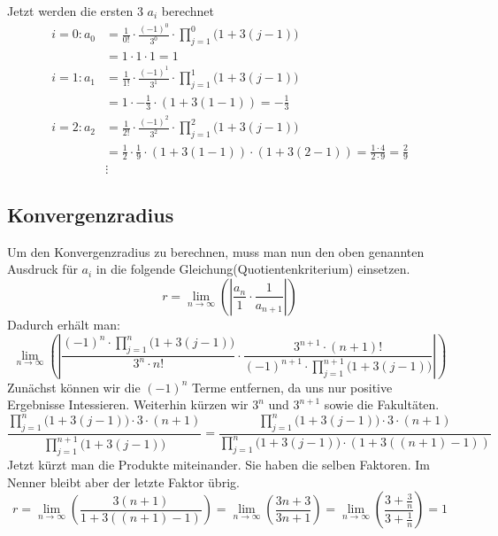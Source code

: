 \documentclass[18pt,a4paper]{article}
\begin{document}
Jetzt werden die ersten 3 $a_i$ berechnet
\begin{align*}
i=0: a_0 &= \frac{1}{0!} \cdot \frac{(-1)^0}{3^0}\cdot\prod_{j=1}^{0}\Big(1+3(j-1)\Big)\\
\quad &= 1 \cdot 1 \cdot 1 = 1\\
%
i=1: a_1 &= \frac{1}{1!} \cdot \frac{(-1)^1}{3^1}\cdot\prod_{j=1}^{1}\Big(1+3(j-1)\Big)\\
\quad &= 1 \cdot -\frac{1}{3} \cdot (1+3(1-1)) = -\frac{1}{3}\\
%
i=2: a_2 &= \frac{1}{2!} \cdot \frac{(-1)^2}{3^2}\cdot\prod_{j=1}^{2}\Big(1+3(j-1)\Big)\\
\quad &= \frac{1}{2} \cdot \frac{1}{9} \cdot (1+3(1-1))\cdot(1+3(2-1)) = \frac{1\cdot4}{2\cdot 9} = \frac{2}{9}\\
&\vdots
\end{align*}
\subsection*{Konvergenzradius}
Um den Konvergenzradius zu berechnen, muss man nun den oben genannten Ausdruck für $a_i$ in die folgende Gleichung(Quotientenkriterium) einsetzen.
\begin{equation*}
r = \lim_{n \to \infty}\left(\left|\frac{a_n}{1}\cdot \frac{1}{a_{n+1}}\right|\right)
\end{equation*}
Dadurch erhält man:
\begin{equation*}
\lim_{n \to \infty}\left(\left|\frac{(-1)^n \cdot\displaystyle\prod_{j=1}^{n}\Big(1+3(j-1)\Big)}{3^n \cdot n!} \cdot \frac{3^{n+1} \cdot (n+1)!}{(-1)^{n+1} \cdot\displaystyle\prod_{j=1}^{n+1}\Big(1+3(j-1)\Big)}\right|\right)
\end{equation*}
Zunächst können wir die $(-1)^n$ Terme entfernen, da uns nur positive Ergebnisse Intessieren. Weiterhin kürzen wir $3^n$ und $3^{n+1}$ sowie die Fakultäten.
\begin{equation*}
\frac{\displaystyle\prod_{j=1}^{n}\Big(1+3(j-1)\Big) \cdot 3 \cdot (n+1)}{\displaystyle\prod_{j=1}^{n+1}\Big(1+3(j-1)\Big)}
=
\frac{\displaystyle\prod_{j=1}^{n}\Big(1+3(j-1)\Big) \cdot 3 \cdot (n+1)}{\displaystyle\prod_{j=1}^{n}\Big(1+3(j-1)\Big)\cdot (1+3((n+1)-1))}
\end{equation*}
Jetzt kürzt man die Produkte miteinander. Sie haben die selben Faktoren. Im Nenner bleibt aber der letzte Faktor übrig.\\
\begin{equation*}
r = \lim_{n \to \infty}\left(\frac{3(n+1 )}{1+3((n+1)-1)}\right) = \lim_{n \to \infty}\left(\frac{3n +3}{3n+1}\right)=\lim_{n \to \infty}\left(\frac{3+\frac{3}{n}}{3+\frac{1}{n}}\right)=1
\end{equation*}

\end{document}
